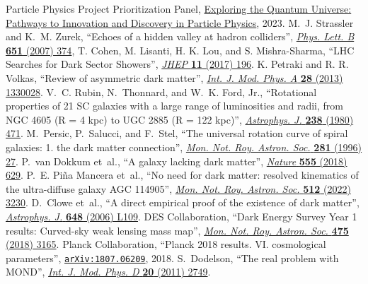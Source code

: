\begin{thebibliography}{99}
 Particle Physics Project Prioritization Panel, \href{https://www.usparticlephysics.org/2023-p5-report/}{Exploring the Quantum Universe: Pathways to Innovation and Discovery in Particle Physics}, 2023.
 M.~J. Strassler and K.~M. Zurek, ``Echoes of a hidden valley at hadron colliders'', \href{http://dx.doi.org/10.1016/j.physletb.2007.06.055}{\textit{Phys. Lett. B} \textbf{651} (2007) 374},
 T. Cohen, M. Lisanti, H. K. Lou, and S. Mishra-Sharma, ``LHC Searches for Dark Sector Showers'', \href{https://doi.org/10.1007/JHEP11(2017)196}{\textit{JHEP} \textbf{11} (2017) 196}.
 K. Petraki and R. R. Volkas, ``Review of asymmetric dark matter'', \href{http://dx.doi.org/10.1142/S0217751X13300287}{\textit{Int. J. Mod. Phys. A} \textbf{28} (2013) 1330028}.
 V.~C. Rubin, N.~Thonnard, and W.~K. Ford, Jr., ``Rotational properties of 21 SC galaxies with a large range of luminosities and radii, from NGC 4605 (R = 4 kpc) to UGC 2885 (R = 122 kpc)'', \href{http://dx.doi.org/10.1086/158003}{\textit{Astrophys. J.} \textbf{238} (1980) 471}.
 M.~Persic, P.~Salucci, and F.~Stel, ``The universal rotation curve of spiral galaxies: 1. the dark matter connection'', \href{http://dx.doi.org/10.1093/mnras/278.1.27}{\textit{Mon.  Not. Roy. Astron. Soc.} \textbf{281} (1996) 27}.
 P.~van Dokkum et~al., ``A galaxy lacking dark matter'', \href{http://dx.doi.org/10.1038/nature25767}{\textit{Nature} \textbf{555} (2018) 629}.
 P.~E. Pi\~na Mancera et~al., ``No need for dark matter: resolved kinematics of the ultra-diffuse galaxy AGC 114905'', \href{http://dx.doi.org/10.1093/mnras/stab3491}{\textit{Mon. Not. Roy. Astron. Soc.} \textbf{512} (2022) 3230}.
 D.~Clowe et~al., ``A direct empirical proof of the existence of dark matter'', \href{http://dx.doi.org/10.1086/508162}{\textit{Astrophys. J.} \textbf{648} (2006) L109}.
 {DES} Collaboration, ``Dark Energy Survey Year 1 results: Curved-sky weak lensing mass map'', \href{http://dx.doi.org/10.1093/mnras/stx3363}{\textit{Mon. Not. Roy. Astron. Soc.} \textbf{475} (2018) 3165}.
 {Planck} Collaboration, ``Planck 2018 results. VI. cosmological parameters'', \href{http://www.arxiv.org/abs/1807.06209}{\texttt{arXiv:1807.06209}}, 2018.
 S.~Dodelson, ``The real problem with MOND'', \href{http://dx.doi.org/10.1142/S0218271811020561}{\textit{Int. J. Mod. Phys. D} \textbf{20} (2011) 2749}.

\end{thebibliography}

